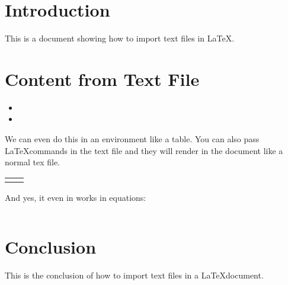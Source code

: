 \documentclass{article}
\begin{document}
\section{Introduction}
This is a document showing how to import text files in \LaTeX.

\section{Content from Text File}


\begin{itemize}
    \item 
    \item 
\end{itemize}

We can even do this in an environment like a table. You can also pass \LaTeX commands in the text file and they will render in the document like a normal tex file.

\begin{center}
    \begin{tabular}[ht]{|c|c|}
        \hline  &  \\ \hline
         &  \\ \hline
    \end{tabular}
\end{center}

And yes, it even in works in equations:

\begin{equation}
    
\end{equation}

\section{Conclusion}
This is the conclusion of how to import text files in a \LaTeX document.
\end{document}
